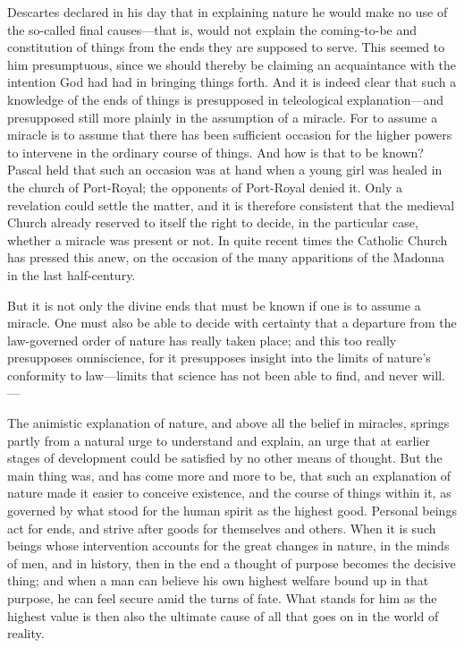 \documentclass[12pt,a4paper]{article}
\newcommand{\opage}[1]{\marginnote{\footnotesize\textit{[#1]}}}
\begin{document}
Descartes declared in his day that in explaining nature he would make no use of the
so-called final causes---that is, would not explain the coming-to-be and
constitution of things from the ends they are supposed to serve. This seemed to him
presumptuous, since we should thereby be claiming an acquaintance with the intention
God had had in bringing things forth. And it is indeed clear that such a knowledge of
the ends of things is presupposed in teleological explanation---and presupposed still
more plainly in the assumption of a miracle. For to assume a miracle is to assume
that there has been sufficient occasion for the higher powers to intervene in the
ordinary course of things. And how is that to be known? Pascal held that such an
occasion was at hand when a young girl was healed in the church of Port-Royal; the
opponents of Port-Royal denied it. Only a revelation could settle the matter, and it
is therefore consistent that the medieval Church already reserved to itself the right
to decide, in the particular case, whether a miracle was present or not. In quite
recent times the Catholic Church has pressed this anew, on the occasion of the many
apparitions of the Madonna in the last half-century.

But it is not only the divine ends that must be known if one is to assume a miracle.
One must also be able to decide with certainty that a departure from the law-governed
order of nature has really taken place; and this too really presupposes omniscience,
for it presupposes \opage{32}insight into the limits of nature's conformity to law---limits
that science has not been able to find, and never will. ---

The animistic explanation of nature, and above all the belief in miracles, springs
partly from a natural urge to understand and explain, an urge that at earlier stages
of development could be satisfied by no other means of thought. But the main thing
was, and has come more and more to be, that such an explanation of nature made it
easier to conceive existence, and the course of things within it, as governed by
what stood for the human spirit as the highest good. Personal beings act for ends,
and strive after goods for themselves and others. When it is such beings whose
intervention accounts for the great changes in nature, in the minds of men, and in
history, then in the end a thought of purpose becomes the decisive thing; and when a
man can believe his own highest welfare bound up in that purpose, he can feel secure
amid the turns of fate. What stands for him as the highest value is then also the
ultimate cause of all that goes on in the world of reality.
\end{document}
